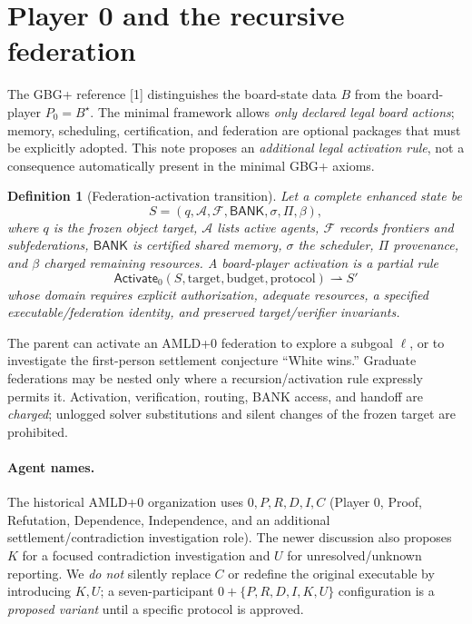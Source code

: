 \documentclass[11pt,letterpaper]{article}
\newtheorem{definition}{Definition}[section]
\newcommand{\BANK}{\mathsf{BANK}}
\begin{document}
\section{Player 0 and the recursive federation}
The GBG+ reference [1] distinguishes the board-state data $B$ from the board-player $P_0=B^\star$. The minimal framework allows \emph{only declared legal board actions}; memory, scheduling, certification, and federation are optional packages that must be explicitly adopted. This note proposes an \emph{additional legal activation rule}, not a consequence automatically present in the minimal GBG+ axioms.

\begin{definition}[Federation-activation transition]
Let a complete enhanced state be
\[
S=(q,\mathcal A,\mathcal F,\BANK,\sigma,\Pi,\beta),
\]
where $q$ is the frozen object target, $\mathcal A$ lists active agents, $\mathcal F$ records frontiers and subfederations, $\BANK$ is certified shared memory, $\sigma$ the scheduler, $\Pi$ provenance, and $\beta$ charged remaining resources. A board-player activation is a partial rule
\[
\mathsf{Activate}_0(S,\text{target},\text{budget},\text{protocol})\rightharpoonup S'
\]
whose domain requires explicit authorization, adequate resources, a specified executable/federation identity, and preserved target/verifier invariants.
\end{definition}

The parent can activate an AMLD+0 federation to explore a subgoal $\ell$, or to investigate the first-person settlement conjecture ``White wins.'' Graduate federations may be nested only where a recursion/activation rule expressly permits it. Activation, verification, routing, BANK access, and handoff are \emph{charged}; unlogged solver substitutions and silent changes of the frozen target are prohibited.

\paragraph{Agent names.} The historical AMLD+0 organization uses $0,P,R,D,I,C$ (Player 0, Proof, Refutation, Dependence, Independence, and an additional settlement/contradiction investigation role). The newer discussion also proposes $K$ for a focused contradiction investigation and $U$ for unresolved/unknown reporting. We \emph{do not} silently replace $C$ or redefine the original executable by introducing $K,U$; a seven-participant $0+\{P,R,D,I,K,U\}$ configuration is a \emph{proposed variant} until a specific protocol is approved.
\end{document}
